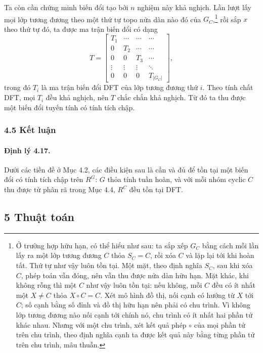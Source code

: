 \documentclass[11pt]{article}
\begin{document}
Ta còn cần chứng minh biến đổi tạo bởi \(n\) nghiệm này khả nghịch. Lần lượt lấy
mọi lớp tương đương theo một thứ tự topo nửa dàn nào đó của \(G_C\),\footnote{Ở
trường hợp hữu hạn, có thể hiểu như sau: ta sắp xếp \(G_C\) bằng cách mỗi lần
lấy ra một lớp tương đương \(C\) thỏa \(S_C=C\), rồi xóa \(C\) và lặp lại tới
khi hoàn tất. Thứ tự như vậy luôn tồn tại. Một mặt, theo định nghĩa \(S_C\),
sau khi xóa \(C\), phép toán vẫn đóng, nên vẫn thu được nửa dàn hữu hạn. Mặt
khác, khi không rỗng thì một \(C\) như vậy luôn tồn tại: nếu không, mỗi \(C\)
đều có ít nhất một \(X\ne C\) thỏa \(X\circ C=C\). Xét mô hình đồ thị, nối cạnh
có hướng từ \(X\) tới \(C\); số cạnh bằng số đỉnh và đồ thị hữu hạn nên phải có
chu trình. Vì không lớp tương đương nào nối cạnh tới chính nó, chu trình có ít
nhất hai phần tử khác nhau. Nhưng với một chu trình, xét kết quả phép \(\circ\)
của mọi phần tử trên chu trình, theo định nghĩa cạnh ta được kết quả này bằng
từng phần tử trên chu trình, mâu thuẫn.} rồi sắp \(x\) theo thứ tự đó, ta được
ma trận biến đổi có dạng
\[
  T=
  \begin{bmatrix}
    T_1 & \cdots & \cdots & \cdots\\
    0 & T_2 & \cdots & \cdots\\
    0 & 0 & T_3 & \cdots\\
    \vdots & \vdots & \vdots & \ddots\\
    0 & 0 & 0 & T_{|G_C|}
  \end{bmatrix},
\]
trong đó \(T_i\) là ma trận biến đổi DFT của lớp tương đương thứ \(i\). Theo
tính chất DFT, mọi \(T_i\) đều khả nghịch, nên \(T\) chắc chắn khả nghịch. Từ đó
ta thu được một biến đổi tuyến tính có tính tích chập.

\subsubsection*{4.5 Kết luận}

\paragraph{Định lý 4.17.}
Dưới các tiền đề ở Mục 4.2, các điều kiện sau là cần và đủ để tồn tại một biến
đổi có tính tích chập trên \(R^G\): \(G\) thỏa tính tuần hoàn, và với mỗi nhóm
cyclic \(C\) thu được từ phân rã trong Mục 4.4, \(R^C\) đều tồn tại DFT.

\subsection*{5 Thuật toán}
\end{document}
